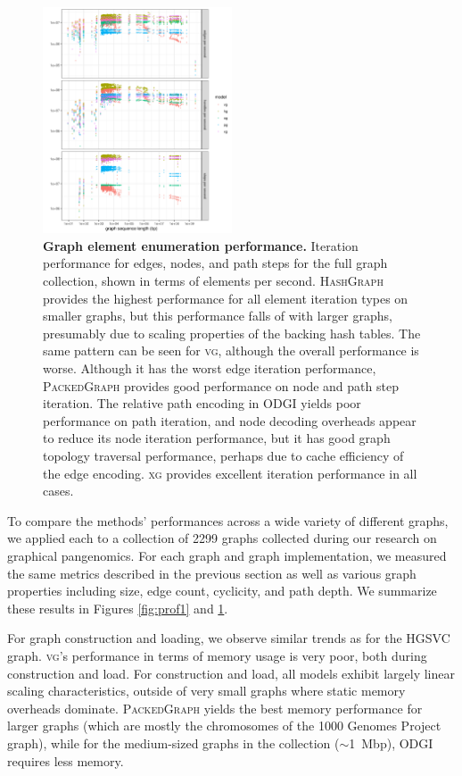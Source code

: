 \documentclass{bioinfo}
\begin{document}
\begin{figure}
  \centering
  \includegraphics[width=0.5\textwidth]{figures/iteration_per_second.png}
  \caption{
    \label{fig:prof2}
    \textbf{Graph element enumeration performance.}
    Iteration performance for edges, nodes, and path steps for the full graph collection, shown in terms of elements per second.
    \textsc{HashGraph} provides the highest performance for all element iteration types on smaller graphs, but this performance falls of with larger graphs, presumably due to scaling properties of the backing hash tables.
    The same pattern can be seen for \textsc{vg}, although the overall performance is worse.
    Although it has the worst edge iteration performance, \textsc{PackedGraph} provides good performance on node and path step iteration.
    The relative path encoding in \textsc{ODGI} yields poor performance on path iteration, and node decoding overheads appear to reduce its node iteration performance, but it has good graph topology traversal performance, perhaps due to cache efficiency of the edge encoding.
    \textsc{xg} provides excellent iteration performance in all cases.
    }
\end{figure}

To compare the methods' performances across a wide variety of different graphs, we applied each to a collection of 2299 graphs collected during our research on graphical pangenomics.
For each graph and graph implementation, we measured the same metrics described in the previous section as well as various graph properties including size, edge count, cyclicity, and path depth.
We summarize these results in Figures \ref{fig:prof1} and \ref{fig:prof2}.

For graph construction and loading, we observe similar trends as for the HGSVC graph.
\textsc{vg}'s performance in terms of memory usage is very poor, both during construction and load.
For construction and load, all models exhibit largely linear scaling characteristics, outside of very small graphs where static memory overheads dominate.
\textsc{PackedGraph} yields the best memory performance for larger graphs (which are mostly the chromosomes of the 1000 Genomes Project graph), while for the medium-sized graphs in the collection ($\sim$1~Mbp), \textsc{ODGI} requires less memory.
\end{document}
